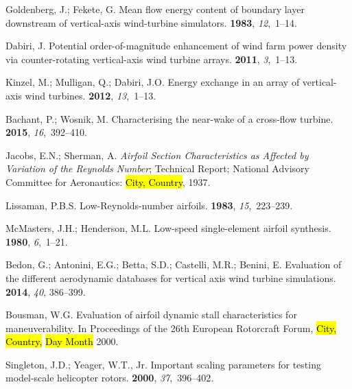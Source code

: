 \documentclass[energies,article,accept,moreauthors,pdftex,10pt,a4paper]{mdpi}
\theoremstyle{mdpi}
\newcounter{ex}
\newcounter{re}
\begin{document}
\begin{thebibliography}{999}
Goldenberg, J.; Fekete, G.
\newblock Mean flow energy content of boundary layer downstream of
 vertical-axis wind-turbine simulators.
 {\bf
 1983}, {\em 12},~1--14.

Dabiri, J.
\newblock Potential order-of-magnitude enhancement of wind farm power density
 via counter-rotating vertical-axis wind turbine arrays.
 {\bf 2011}, {\em
 3},~1--13.

Kinzel, M.; Mulligan, Q.; Dabiri, J.O.
\newblock Energy exchange in an array of vertical-axis wind turbines.
 {\bf 2012}, {\em 13},~1--13.

Bachant, P.; Wosnik, M.
\newblock Characterising the near-wake of a cross-flow turbine.
 {\bf 2015}, {\em 16},~392--410.

Jacobs, E.N.; Sherman, A.
\newblock \emph{Airfoil Section Characteristics as Affected by Variation of the
 Reynolds Number};
\newblock Technical Report; National Advisory Committee for Aeronautics: \hl{City, Country}, 1937.

Lissaman, P.B.S.
\newblock Low-{R}eynolds-number airfoils.
 {\bf 1983}, {\em
 15},~223--239.

McMasters, J.H.; Henderson, M.L.
\newblock Low-speed single-element airfoil synthesis.
 {\bf 1980}, {\em 6},~1--21.

Bedon, G.; Antonini, E.G.; Betta, S.D.; Castelli, M.R.; Benini, E.
\newblock Evaluation of the different aerodynamic databases for vertical axis
 wind turbine simulations.
 {\bf 2014}, {\em 40}, 386--399.

Bousman, W.G.
\newblock Evaluation of airfoil dynamic stall characteristics for
 maneuverability.
\newblock In Proceedings of the 26th {E}uropean Rotorcraft Forum, \hl{City, Country,} \hl{Day Month} 2000.

Singleton, J.D.; Yeager, W.T., Jr.
\newblock Important scaling parameters for testing model-scale helicopter
 rotors.
 {\bf 2000}, {\em 37},~396--402.


\end{thebibliography}
\end{document}
